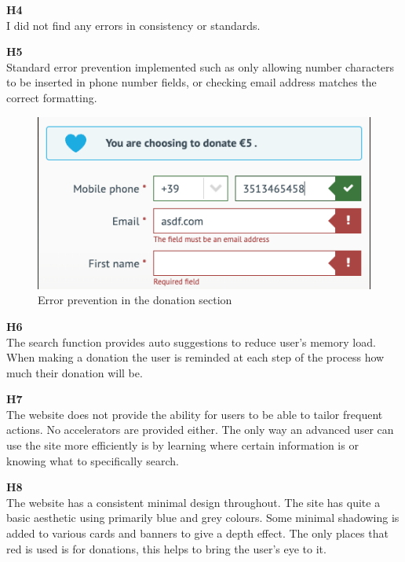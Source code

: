 \begin{description}
    \item {\textbf{H4} \color{unicefGray}{Consistency and standards}}\\
	I did not find any errors in consistency or standards.    
    \item {\textbf{H5} \color{unicefGray}{Error prevention}}\\
    Standard error prevention implemented such as only allowing number characters to be inserted in phone number fields, or checking email address matches the correct formatting. 
    \begin{figure}[h]
        \centering
        \includegraphics[scale=1.0]{Resources/Harry/Harry_H5.png}
        \caption{Error prevention in the donation section}
    \end{figure}
    \item {\textbf{H6} \color{unicefGray}{Recognition rather than recall}}\\
    The search function provides auto suggestions to reduce user’s memory load. When making a donation the user is reminded at each step of the process how much their donation will be. 
    \item {\textbf{H7} \color{unicefGray}{Flexibility and efficiency of use}}\\
    The website does not provide the ability for users to be able to tailor frequent actions. No accelerators are provided either. The only way an advanced user can use the site more efficiently is by learning where certain information is or knowing what to specifically search. 
    \item {\textbf{H8} \color{unicefGray}{Aesthetic and minimalist design}}\\
    The website has a consistent minimal design throughout. The site has quite a basic aesthetic using primarily blue and grey colours. Some minimal shadowing is added to various cards and banners to give a depth effect. The only places that red is used is for donations, this helps to bring the user’s eye to it. 

\end{description}

